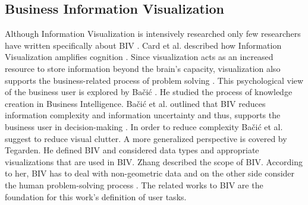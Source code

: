 \subsection{Business Information Visualization}
Although Information Visualization is intensively researched  \cite{Shneiderman2008,  Shneiderman2002,  Shneiderman1996,  Keim2002, yi2008understanding, Liu2014, Lee2016, Ellis2007, Ware2012, Kreuseler2000} only few researchers have written specifically about \gls{BIV} \cite{Bacic2012, Bacic2013, Zhang1995, Zhang1998, Zhang2001}. Card et al. described how Information Visualization amplifies cognition \cite{Card1999}. Since visualization acts as an increased resource to store information beyond the brain's capacity, visualization also supports the business-related process of problem solving  \cite{Bacic2012}. This psychological view of the business user is explored by Bačić \cite{Bacic2013,  Bacic2012}. He studied the process of knowledge creation in Business Intelligence. Bačić et al. outlined that \gls{BIV} reduces information complexity and information uncertainty and thus, supports the business user in decision-making \cite{Bacic2012, Bacic2013}. In order to reduce complexity Bačić et al. suggest to reduce visual clutter.
 A more generalized perspective is covered by Tegarden. He defined \gls{BIV} and considered data types and appropriate visualizations that are used in \gls{BIV}. Zhang  \cite{Zhang1995,  Zhang1998,  Zhang2001} described the scope of \gls{BIV}. According to her, \gls{BIV} has to deal with non-geometric data and on the other side consider the human problem-solving process \cite{Zhang2001}.  The related works to \gls{BIV} are the foundation for this work's definition of user tasks. 
 
\par
\pagebreak
